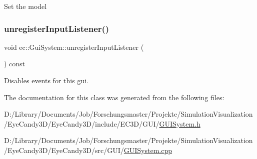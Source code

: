 Set the model \mbox{\label{classec_1_1_gui_system_a18d7d063334763b264da1392199f4c4e}} 
\subsubsection{\texorpdfstring{unregister\+Input\+Listener()}{unregisterInputListener()}}
{\footnotesize\ttfamily void ec\+::\+Gui\+System\+::unregister\+Input\+Listener (\begin{DoxyParamCaption}{ }\end{DoxyParamCaption}) const}

Disables events for this gui. 

The documentation for this class was generated from the following files\+:\begin{DoxyCompactItemize}
\item 
D\+:/\+Library/\+Documents/\+Job/\+Forschungsmaster/\+Projekte/\+Simulation\+Visualization/\+Eye\+Candy3\+D/\+Eye\+Candy3\+D/include/\+E\+C3\+D/\+G\+U\+I/\mbox{\hyperlink{_g_u_i_system_8h}{G\+U\+I\+System.\+h}}\item 
D\+:/\+Library/\+Documents/\+Job/\+Forschungsmaster/\+Projekte/\+Simulation\+Visualization/\+Eye\+Candy3\+D/\+Eye\+Candy3\+D/src/\+G\+U\+I/\mbox{\hyperlink{_g_u_i_system_8cpp}{G\+U\+I\+System.\+cpp}}\end{DoxyCompactItemize}
